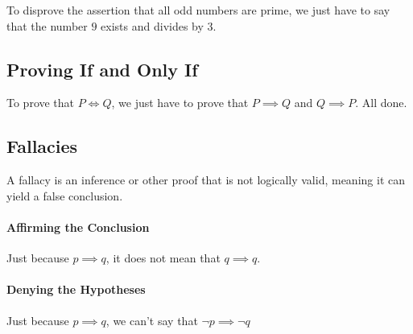 To disprove the assertion that all odd numbers are prime, we just have to say that the number \(9\) exists and divides by 3.

\subsection{Proving If and Only If}\label{sub:proving_if_and_only_if}

To prove that \(P \iff Q\), we just have to prove that \(P \implies Q\) and \(Q \implies P\).
All done.

\subsection{Fallacies}\label{sub:fallacies}

A fallacy is an inference or other proof that is not logically valid, meaning it can yield a false conclusion.

\paragraph{Affirming the Conclusion}\label{par:affirming_the_conclusion}

Just because \(p \implies q\), it does not mean that \(q \implies q\).

\paragraph{Denying the Hypotheses}\label{par:denying_the_hypotheses}

Just because \(p \implies q\), we can't say that \(\neg p \implies \neg q\)

